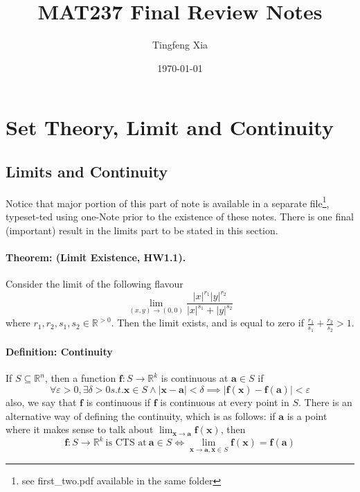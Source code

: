 \documentclass[12pt]{article}
\title{MAT237 Final Review Notes}
\author{Tingfeng Xia}
\date{\today}
\newcommand{\real}{\mathbb{R}}
\newcommand{\va}{\mathbf{a}}
\newcommand{\vx}{\mathbf{x}}
\newcommand{\ba}{\mathbf{a}}
\newcommand{\boldf}{\mathbf{f}}
\begin{document}
\maketitle
\tableofcontents
\newpage

\section{Set Theory, Limit and Continuity}
\subsection{Limits and Continuity}
Notice that major portion of this part of note is available in a separate file\footnote{see first\_two.pdf available in the same folder}, typeset-ted using one-Note prior to the existence of these notes. There is one final (important) result in the limits part to be stated in this section.
\paragraph{Theorem: (Limit Existence, HW1.1).} Consider the limit of the following flavour
\begin{equation*}
    \lim_{(x,y)\rightarrow{}(0,0)} \frac{|x|^{r_1}|y|^{r_2}}{|x|^{s_1} + |y|^{s_2}}
\end{equation*}
where $r_1,r_2,s_1,s_2\in \real^{>0}$. Then the limit exists, and is equal to zero if $\frac{r_1}{s_1} + \frac{r_2}{s_2} > 1$.
\paragraph{Definition: Continuity} If $S\subseteq \real^n$, then a function $\mathbf{f}: {S}\rightarrow{}{\real^k}$ is continuous at $\ba\in S$ if
\begin{equation*}
    \forall \varepsilon > 0, \exists \delta >0 s.t. \vx\in S \land |\vx-\va|< \delta \implies |\boldf(\vx) - \boldf(\va)|<\varepsilon
\end{equation*}
also, we say that $\boldf$ is continuous if $\boldf$ is continuous at every point in $S$. There is an alternative way of defining the continuity, which is as follows: if $\va$ is a point where it makes sense to talk about $\lim_{\vx\rightarrow{}\va}\boldf(\vx)$, then
\begin{equation*}
    \boldf:S\rightarrow{}\real^k~\text{is CTS at}~\va\in S\iff \lim_{\vx\rightarrow{}\va,\vx\in S} \boldf(\vx) = \boldf(\va)
\end{equation*}
\end{document}
